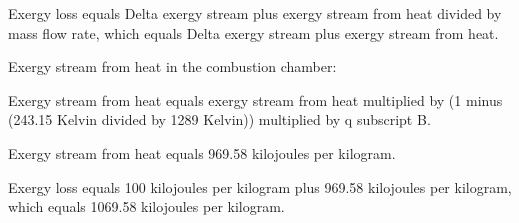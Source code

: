 Exergy loss equals Delta exergy stream plus exergy stream from heat divided by mass flow rate, which equals Delta exergy stream plus exergy stream from heat.  

Exergy stream from heat in the combustion chamber:  

Exergy stream from heat equals exergy stream from heat multiplied by (1 minus (243.15 Kelvin divided by 1289 Kelvin)) multiplied by q subscript B.  

Exergy stream from heat equals 969.58 kilojoules per kilogram.  

Exergy loss equals 100 kilojoules per kilogram plus 969.58 kilojoules per kilogram, which equals 1069.58 kilojoules per kilogram.